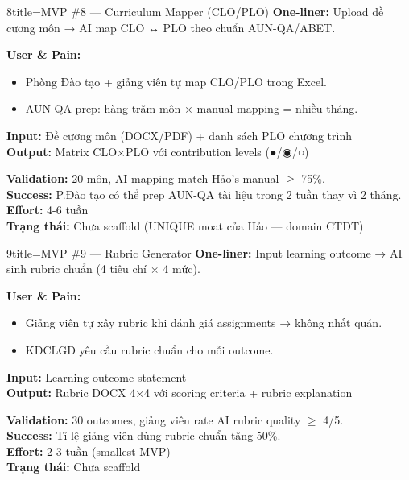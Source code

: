 \documentclass[11pt,a4paper]{article}
\begin{document}
\begin{mvpbox}{8}{title=MVP \#8 — Curriculum Mapper (CLO/PLO)}
\textbf{One-liner:} Upload đề cương môn → AI map CLO ↔ PLO theo chuẩn AUN-QA/ABET.

\textbf{User \& Pain:}
\begin{itemize}
\item Phòng Đào tạo + giảng viên tự map CLO/PLO trong Excel.
\item AUN-QA prep: hàng trăm môn × manual mapping = nhiều tháng.
\end{itemize}

\textbf{Input:} Đề cương môn (DOCX/PDF) + danh sách PLO chương trình\\
\textbf{Output:} Matrix CLO×PLO với contribution levels (●/◉/○)

\textbf{Validation:} 20 môn, AI mapping match Hảo's manual $\geq$ 75\%.\\
\textbf{Success:} P.Đào tạo có thể prep AUN-QA tài liệu trong 2 tuần thay vì 2 tháng.\\
\textbf{Effort:} 4-6 tuần\\
\textbf{Trạng thái:} Chưa scaffold (UNIQUE moat của Hảo --- domain CTĐT)
\end{mvpbox}

\begin{mvpbox}{9}{title=MVP \#9 — Rubric Generator}
\textbf{One-liner:} Input learning outcome → AI sinh rubric chuẩn (4 tiêu chí × 4 mức).

\textbf{User \& Pain:}
\begin{itemize}
\item Giảng viên tự xây rubric khi đánh giá assignments → không nhất quán.
\item KĐCLGD yêu cầu rubric chuẩn cho mỗi outcome.
\end{itemize}

\textbf{Input:} Learning outcome statement\\
\textbf{Output:} Rubric DOCX 4×4 với scoring criteria + rubric explanation

\textbf{Validation:} 30 outcomes, giảng viên rate AI rubric quality $\geq$ 4/5.\\
\textbf{Success:} Tỉ lệ giảng viên dùng rubric chuẩn tăng 50\%.\\
\textbf{Effort:} 2-3 tuần (smallest MVP)\\
\textbf{Trạng thái:} Chưa scaffold
\end{mvpbox}
\end{document}
